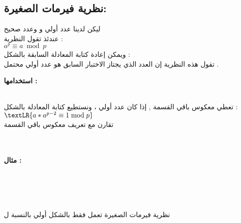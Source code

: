 \documentclass[11pt,a4paper]{report}
\begin{document}
\begin{otherlanguage}{arabic}
\chapter{نظرية فيرمات الصغيرة:}
\begin{otherlanguage}{arabic}
\begin{center}
ليكن لدينا عدد أولي \textit{} و وعدد صحيح \textit{} 
\\
عندئذ تقول النظرية :
\\
\textit{$ a^{p} \equiv a  \bmod p $}
\\
ويمكن إعادة كتابة المعادلة السابقة بالشكل : \textit{}
\\
تقول هذه النظرية إن العدد   
الذي يجتاز الاختبار السابق هو عدد أولي محتمل .
\newline
\begin{flushleft}
\textbf{استخدامها :}
\end{flushleft}
\\
تعطي معكوس باقي القسمة , إذا كان \textit{} عدد أولي  ، ونستطيع كتابة المعادلة بالشكل :
\\
\textit{$ \textLR{a * a^{p-2} \equiv 1 \bmod p} $}
\\
تقارن مع تعريف معكوس باقي القسمة 
\\
\textit{}
\\
\textit{} 
\\
\begin{flushleft}
\textbf{مثال :}
\end{flushleft}
\\
\textit{}
\\
\textit{}
\\
\textit{}
\\
نظرية فيرمات الصغيرة تعمل فقط بالشكل  \textit{} أولي بالنسبة ل \textit{ }


\end{center}
\end{otherlanguage}
\end{otherlanguage}
\end{document}
